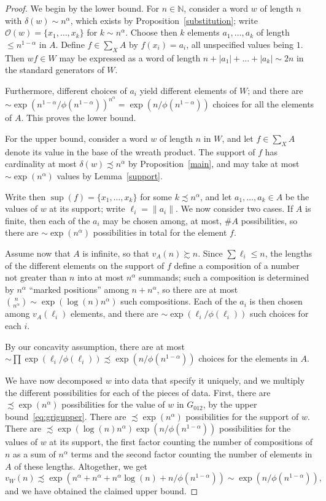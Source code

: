\documentclass{amsart}
\newcommand\N{\mathbb{N}}
\newcommand\Grig{{G_{012}}}
\theoremstyle{definition}
\begin{document}
\begin{proof}
  We begin by the lower bound. For $n\in\N$, consider a word $w$ of
  length $n$ with $\delta(w)\sim n^\alpha$, which exists by
  Proposition~\ref{substitution}; write $\mathcal O(w)=\{x_1,\dots,x_k\}$
  for $k\sim n^\alpha$. Choose then $k$ elements $a_1,\dots,a_k$ of
  length $\le n^{1-\alpha}$ in $A$. Define $f\in \sum_XA$ by
  $f(x_i)=a_i$, all unspecified values being $1$. Then $wf\in W$ may
  be expressed as a word of length $n+|a_1|+\dots+|a_k|\sim 2n$ in the
  standard generators of $W$.

  Furthermore, different choices of $a_i$ yield different elements of
  $W$; and there are $\sim
  \exp(n^{1-\alpha}/\phi(n^{1-\alpha}))^{n^\alpha}=\exp(n/\phi(n^{1-\alpha}))$
  choices for all the elements of $A$. This proves the lower bound.

  For the upper bound, consider a word $w$ of length $n$ in $W$, and
  let $f\in\sum_XA$ denote its value in the base of the wreath
  product. The support of $f$ has cardinality at most
  $\delta(w)\precsim n^\alpha$ by Proposition~\ref{main}, and may take
  at most $\sim\exp(n^\alpha)$ values by Lemma~\ref{support}.

  Write then $\sup(f)=\{x_1,\dots,x_k\}$ for some $k\precsim
  n^\alpha$, and let $a_1,\dots,a_k\in A$ be the values of $w$ at its
  support; write $\ell_i=\|a_i\|$. We now consider two cases. If $A$
  is finite, then each of the $a_i$ may be chosen among, at most,
  $\#A$ possibilities, so there are $\sim\exp(n^\alpha)$ possibilities
  in total for the element $f$.

  Assume now that $A$ is infinite, so that $v_A(n)\succsim n$. Since
  $\sum\ell_i\le n$, the lengths of the different elements on the
  support of $f$ define a composition of a number not greater than $n$
  into at most $n^\alpha$ summands; such a composition is determined
  by $n^\alpha$ ``marked positions'' among $n+n^\alpha$, so there are
  at most $\binom{n}{n^\alpha}\sim\exp(\log(n)n^\alpha)$ such
  compositions. Each of the $a_i$ is then chosen among $v_A(\ell_i)$
  elements, and there are $\sim\exp(\ell_i/\phi(\ell_i))$ such choices
  for each $i$.

  By our concavity assumption, there are at most
  $\sim\prod\exp(\ell_i/\phi(\ell_i))\precsim\exp(n/\phi(n^{1-\alpha}))$
  choices for the elements in $A$.

  We have now decomposed $w$ into data that specify it uniquely, and
  we multiply the different possibilities for each of the pieces of
  data. First, there are $\precsim\exp(n^\alpha)$ possibilities for
  the value of $w$ in $\Grig$, by the upper
  bound~\eqref{eq:grigupper}. There are $\precsim\exp(n^\alpha)$
  possibilities for the support of $w$. There are
  $\precsim\exp(\log(n)n^\alpha)\exp(n/\phi(n^{1-\alpha}))$
  possibilities for the values of $w$ at its support, the first factor
  counting the number of compositions of $n$ as a sum of $n^\alpha$
  terms and the second factor counting the number of elements in $A$
  of these lengths. Altogether, we get
  \[v_W(n)\precsim\exp(n^\alpha+n^\alpha+n^\alpha\log(n)+n/\phi(n^{1-\alpha}))\sim\exp(n/\phi(n^{1-\alpha})),
  \]
  and we have obtained the claimed upper bound.
\end{proof}
\end{document}

